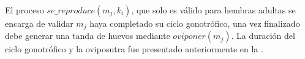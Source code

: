 El proceso $se\_reproduce(m_{j}, k_{i})$, que solo es válido para hembras adultas se encarga de
validar $m_{j}$ haya completado su ciclo gonotrófico, una vez finalizado debe generar una tanda de
huevos mediante $oviponer(m_{j})$. La duración del ciclo gonotrófico y la oviposutra fue presentado
anteriormente en la .

